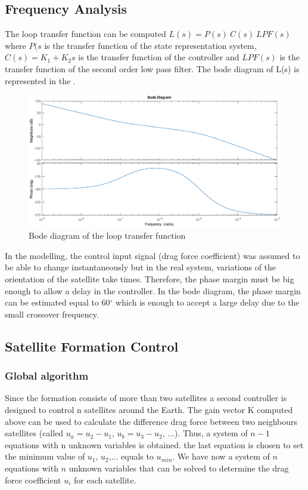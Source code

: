  \subsection{Frequency Analysis}
The loop transfer function can be computed $L(s) = P(s) \ C(s) \ LPF(s)$ where $P(s$ is the transfer function of the state representation system, $C(s) = K_1 + K_2 s$ is the transfer function of the controller and $LPF(s)$ is the transfer function of the second order low pass filter.
The bode diagram of L(s) is represented in the . \\
\begin{figure}[H]
	\centering
	\includegraphics[width=0.9\linewidth]
	{figures/Bode_L.eps}
	\caption{Bode diagram of the loop transfer function}
	\label{fig:Bode_L}
\end{figure}
In the modelling, the control input signal (drag force coefficient) was assumed to be able to change instantaneously but in the real system, variations of the orientation of the satellite take times. Therefore, the phase margin must be big enough to allow a delay in the controller. In the bode diagram, the phase margin can be estimated equal to 60$^{\circ}$  which is enough to accept a large delay due to the small crossover frequency. \\
\subsection{Satellite Formation Control} 
\subsubsection{Global algorithm}
Since the formation consists of more than two satellites a second controller is designed to control n satellites around the Earth. The gain vector K computed above can be used to calculate the difference drag force between two neighbours satellites (called $u_a = u_2 - u_1$, $u_b = u_3 - u_2$, ...). Thus, a system of $n-1$ equations with n unknown variables is obtained. the last equation is chosen to set the minimum value of $u_1$, $u_2$,... equals to $u_{min}$. We have now a system of $n$ equations with $n$ unknown variables that can be solved to determine the drag force coefficient $u_i$ for each satellite.
